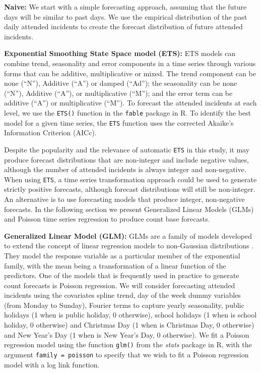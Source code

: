 \documentclass[
  authoryear,
  preprint,
  3p]{elsarticle}
\begin{document}
\textbf{Naive:} We start with a simple forecasting approach, assuming
that the future days will be similar to past days. We use the empirical
distribution of the past daily attended incidents to create the forecast
distribution of future attended incidents.

\textbf{Exponential Smoothing State Space model (ETS):} ETS models
\citep{hyndman2021forecasting} can combine trend, seasonality and error
components in a time series through various forms that can be additive,
multiplicative or mixed. The trend component can be none (``N''),
Additive (``A'') or damped (``Ad''); the seasonality can be none
(``N''), Additive (``A''), or multiplicative (``M''); and the error term
can be additive (``A'') or multiplicative (``M''). To forecast the
attended incidents at each level, we use the \texttt{ETS()} function in
the \texttt{fable} package \citep{fable2022} in R. To identify the best
model for a given time series, the \texttt{ETS} function uses the
corrected Akaike's Information Criterion (AICc).

Despite the popularity and the relevance of automatic \texttt{ETS} in
this study, it may produce forecast distributions that are non-integer
and include negative values, although the number of attended incidents
is always integer and non-negative. When using \texttt{ETS}, a time
series transformation approach could be used to generate strictly
positive forecasts, although forecast distributions will still be
non-integer. An alternative is to use forecasting models that produce
integer, non-negative forecasts. In the following section we present
Generalized Linear Models (GLMs) and Poisson time series regression to
produce count base forecasts.

\textbf{Generalized Linear Model (GLM):} GLMs are a family of models
developed to extend the concept of linear regression models to
non-Gaussian distributions \citep{Faraway2016}. They model the response
variable as a particular member of the exponential family, with the mean
being a transformation of a linear function of the predictors. One of
the models that is frequently used in practice to generate count
forecasts is Poisson regression. We will consider forecasting attended
incidents using the covariates spline trend, day of the week dummy
variables (from Monday to Sunday), Fourier terms to capture yearly
seasonality, public holidays (1 when is public holiday, 0 otherwise),
school holidays (1 when is school holiday, 0 otherwise) and Christmas
Day (1 when is Christmas Day, 0 otherwise) and New Year's Day (1 when is
New Year's Day, 0 otherwise). We fit a Poisson regression model using
the function \texttt{glm()} from the \emph{stats} package in R, with the
argument \texttt{family\ =\ poisson} to specify that we wish to fit a
Poisson regression model with a log link function.
\end{document}
